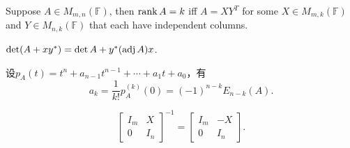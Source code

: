   \begin{lemma}
    Suppose $A\in M_{m,n}(\mathbb{F})$, then $\operatorname{rank} A = k$ iff $A=XY^T$ for some
    $X\in M_{m,k}(\mathbb{F})$ and $Y\in M_{n,k}(\mathbb{F})$ that each have 
    independent columns.
  \end{lemma}

  \begin{lemma}
    $\det(A+xy^*) = \det A + y^*(\operatorname{adj} A)x$.
  \end{lemma}

  \begin{lemma}[特征多项式系数]
    设$p_A(t)=t^n+a_{n-1}t^{n-1}+\cdots+a_1t+a_0$，有
    \[
      a_k = \frac{1}{k!}p_A^{(k)}(0) = (-1)^{n-k}E_{n-k}(A).
    \]
  \end{lemma}

  \begin{lemma}
    \[
      \begin{bmatrix}
        I_m & X \\
        0   & I_n
      \end{bmatrix}^{-1}
      = \begin{bmatrix}
        I_m & -X \\
        0   & I_n
      \end{bmatrix}.
    \]
  \end{lemma}


